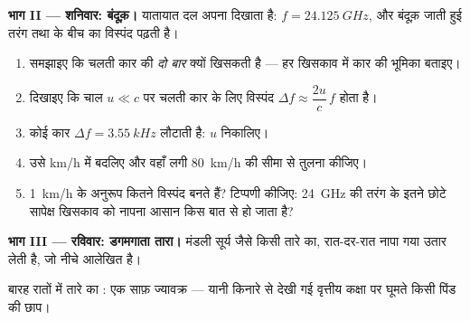 \begin{problem}
\medskip
\noindent\textbf{भाग II --- शनिवार:  बंदूक़।}
यातायात दल अपना  दिखाता है: $f = \qty{24.125}{GHz}$, और बंदूक़ जाती हुई
तरंग तथा  के बीच का विस्पंद पढ़ती है।
\begin{enumerate}[resume]
  \item समझाइए कि चलती कार की  \emph{दो बार} क्यों खिसकती
        है --- हर खिसकाव में कार की भूमिका बताइए।
  \item दिखाइए कि चाल $u \ll c$ पर चलती कार के लिए विस्पंद $\Delta f \approx \dfrac{2u}{c}\,f$ होता है।
  \item कोई कार $\Delta f = \qty{3.55}{kHz}$ लौटाती है: $u$ निकालिए।
  \item उसे \unit{km/h} में बदलिए और वहाँ लगी \qty{80}{km/h} की सीमा से तुलना कीजिए।
  \item \qty{1}{km/h} के अनुरूप कितने  विस्पंद बनते हैं? टिप्पणी
        कीजिए: \qty{24}{GHz} की तरंग के इतने छोटे सापेक्ष खिसकाव को
        नापना आसान किस बात से हो जाता है?
\end{enumerate}

\medskip
\noindent\textbf{भाग III --- रविवार: डगमगाता तारा।}
मंडली सूर्य जैसे किसी तारे का, रात-दर-रात नापा गया  उतार
लेती है, जो नीचे आलेखित है।

\begin{omfigure}

{\small बारह रातों में तारे का : एक साफ़ ज्यावक्र --- यानी
किनारे से देखी गई वृत्तीय कक्षा पर घूमते किसी पिंड की छाप।}
\end{omfigure}


\end{problem}

